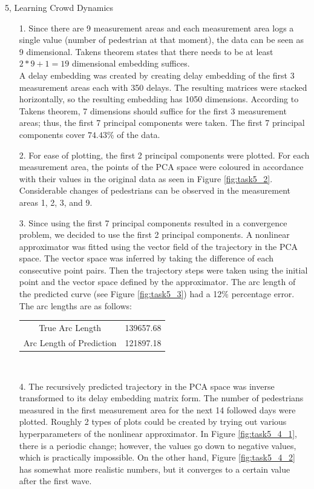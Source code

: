 \documentclass[10pt,a4paper]{article}
\begin{document}
\begin{task}{5, Learning Crowd Dynamics}

\begin{enumerate}
\item[1.] Since there are 9 measurement areas and each measurement area logs a single value (number of pedestrian at that moment), the data can be seen as 9 dimensional. Takens theorem states that there needs to be at least $2*9+1=19$ dimensional embedding suffices. \\
A delay embedding was created by creating delay embedding of the first 3 measurement areas each with 350 delays. The resulting matrices were stacked horizontally, so the resulting embedding has 1050 dimensions. According to Takens theorem, 7 dimensions should suffice for the first 3 measurement areas; thus, the first 7 principal components were taken. The first 7 principal components cover $74.43\%$ of the data.

\item[2.] For ease of plotting, the first 2 principal components were plotted. For each measurement area, the points of the PCA space were coloured in accordance with their values in the original data as seen in Figure \ref{fig:task5_2}. Considerable changes of pedestrians can be observed in the measurement areas 1, 2, 3, and 9.

\item[3.] Since using the first 7 principal components resulted in a convergence problem, we decided to use the first 2 principal components. A nonlinear approximator was fitted using the vector field of the trajectory in the PCA space. The vector space was inferred by taking the difference of each consecutive point pairs. Then the trajectory steps were taken using the initial point and the vector space defined by the approximator. The arc length of the predicted curve (see Figure \ref{fig:task5_3}) had a 12\% percentage error. The arc lengths are as follows:\\

\begin{tabular}{c|c}
    True Arc Length & 139657.68 \\
    Arc Length of Prediction & 121897.18
\end{tabular}\\

\item[4.] The recursively predicted trajectory in the PCA space was inverse transformed to its delay embedding matrix form. The number of pedestrians measured in the first measurement area for the next 14 followed days were plotted. Roughly 2 types of plots could be created by trying out various hyperparameters of the nonlinear approximator. In Figure \ref{fig:task5_4_1}, there is a periodic change; however, the values go down to negative values, which is practically impossible. On the other hand, Figure \ref{fig:task5_4_2} has somewhat more realistic numbers, but it converges to a certain value after the first wave. 


\end{enumerate}
\end{task}
\end{document}
